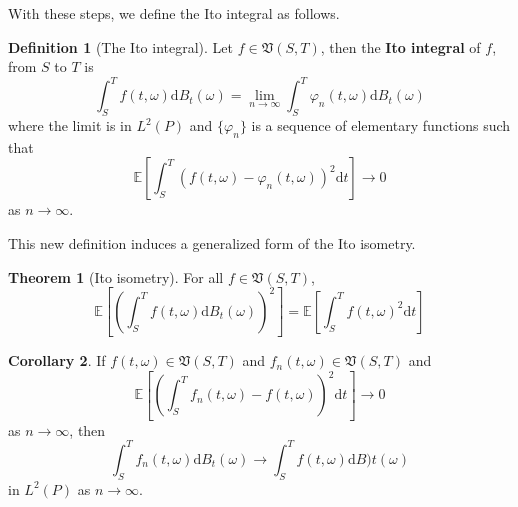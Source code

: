 \documentclass[12pt,a4paper]{article}
\theoremstyle{definition}
\newtheorem{theorem}{Theorem}[section]
\newtheorem{corollary}[theorem]{Corollary}
\newtheorem{definition}{Definition}[section]
\begin{document}
With these steps, we define the Ito integral as follows.

\begin{definition}[The Ito integral]
	Let $f \in \mathfrak{V}(S,T)$, then the \textbf{Ito integral} of $f$, from $S$ to $T$ is
	\[
		\int_S^T f(t, \omega) \mathrm{d}B_t(\omega) = \lim_{n \to \infty} \int_S^T \varphi_n (t, \omega)  \mathrm{d}B_t(\omega)
	\]
	where the limit is in $L^2(P)$ and $\{\varphi_n \}$ is a sequence of elementary functions such that
	\[
		\mathbb{E} \left[ \int_S^T (f(t, \omega) - \varphi_n(t, \omega))^2 \mathrm{d}t \right] \longrightarrow 0
	\] 
	as $n \to \infty$.
\end{definition}

This new definition induces a generalized form of the Ito isometry.

\begin{theorem}[Ito isometry]
	For all $f \in \mathfrak{V}(S,T)$,	
	\[
		\mathbb{E}\left[\left( \int_S^T f(t,\omega) \mathrm{d}B_t(\omega) \right)^2 \right] = \mathbb{E} \left[\int_S^T f(t,\omega)^2 \mathrm{d}t \right]
	\]
\end{theorem}

\begin{corollary}
	If $f(t, \omega) \in \mathfrak{V}(S,T)$ and $f_n(t, \omega) \in \mathfrak{V}(S,T)$ and
	\[
		\mathbb{E}\left[\left( \int_S^T f_n(t,\omega) - f(t, \omega) \right)^2 \mathrm{d}t \right] \longrightarrow 0
		\]
	as $n \to \infty$, then
	\[
		\int_S^T f_n(t, \omega) \mathrm{d}B_t(\omega) \longrightarrow \int_S^T f(t, \omega) \mathrm{d} B)t(\omega)
	\]
	in $L^2(P)$ as $n \to \infty$.
\end{corollary}
\end{document}
